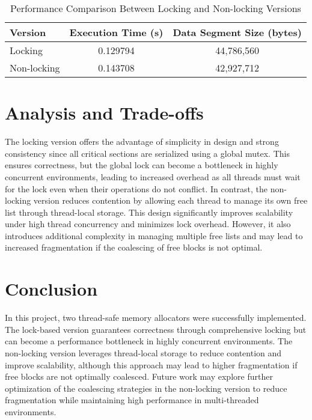 \documentclass[12pt]{article}
\begin{document}
\begin{table}[h]
    \centering
    \caption{Performance Comparison Between Locking and Non-locking Versions}
    \begin{tabular}{@{}lcc@{}}
        \toprule
        Version                   & Execution Time (s) & Data Segment Size (bytes) \\ \midrule
        Locking      & 0.129794             & 44,786,560              \\
        Non-locking  & 0.143708             & 42,927,712              \\ \bottomrule
    \end{tabular}
    \label{tab:comparison}
\end{table}

\section{Analysis and Trade-offs}
The locking version offers the advantage of simplicity in design and strong consistency since all critical sections are serialized using a global mutex. This ensures correctness, but the global lock can become a bottleneck in highly concurrent environments, leading to increased overhead as all threads must wait for the lock even when their operations do not conflict. In contrast, the non-locking version reduces contention by allowing each thread to manage its own free list through thread-local storage. This design significantly improves scalability under high thread concurrency and minimizes lock overhead. However, it also introduces additional complexity in managing multiple free lists and may lead to increased fragmentation if the coalescing of free blocks is not optimal.

\section{Conclusion}
In this project, two thread-safe memory allocators were successfully implemented. The lock-based version guarantees correctness through comprehensive locking but can become a performance bottleneck in highly concurrent environments. The non-locking version leverages thread-local storage to reduce contention and improve scalability, although this approach may lead to higher fragmentation if free blocks are not optimally coalesced. Future work may explore further optimization of the coalescing strategies in the non-locking version to reduce fragmentation while maintaining high performance in multi-threaded environments.
\end{document}
